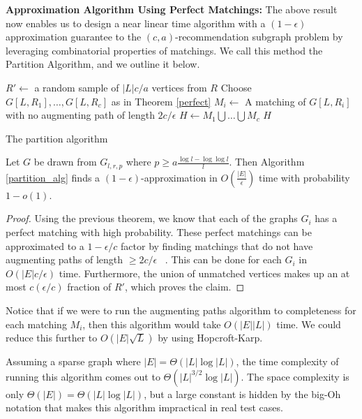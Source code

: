 \vs

{\bf Approximation Algorithm Using Perfect Matchings:}
The above result now enables us to design a near linear time
algorithm with a $(1-\epsilon)$ approximation guarantee
to the $(c,a)$-recommendation subgraph problem by leveraging
combinatorial properties of matchings. We call this method
the Partition Algorithm, and we outline it below.

\begin{algorithm}[h]\label{partition_alg}
  \SetAlgoLined
  $R' \leftarrow$ a random sample of $|L|c/a$ vertices from $R$\;
  Choose $G[L,R_1],\ldots,G[L,R_c]$ as in Theorem \ref{perfect}\;
   {
    $M_i \leftarrow$ A matching of $G[L,R_i]$ with no augmenting path of length $2c/\epsilon$\;
  }
  $H \leftarrow M_1\bigcup\ldots \bigcup M_c$\;
  \Return $H$\;
  \caption{The partition algorithm}
\end{algorithm}\vs

\begin{thm}
Let $G$ be drawn from $G_{l,r,p}$ where $p \geq a\frac{\log l - \log\log l}{l}$.
Then Algorithm \ref{partition_alg} finds a $(1-\epsilon)$-approximation
in $O(\frac{|E|}{\epsilon})$ time with probability $1-o(1)$.
\end{thm}
\begin{proof}
Using the previous theorem, we know that each of the graphs $G_i$ has a
perfect matching with high probability. These perfect matchings
can be approximated to a $1-\epsilon/c$ factor by finding matchings
that do not have augmenting paths of length $\geq 2c/\epsilon$
~\cite{LovaszPlummer1986}. This can be done for each $G_i$ in
$O(|E|c/\epsilon)$ time. Furthermore, the union of unmatched vertices
makes up an at most $c(\epsilon/c)$ fraction of $R'$, which proves the claim.
\end{proof}

Notice that if we were to run the augmenting paths algorithm to completeness
for each matching $M_i$, then this algorithm would take $O(|E||L|)$ time. We
could reduce this further to $O(|E|\sqrt{L})$ by using Hopcroft-Karp.
\cite{HopcroftKarp} \vs

Assuming
a sparse graph where $|E|=\Theta(|L|\log|L|)$, the time complexity of running
this algorithm comes out to $\Theta(|L|^{3/2}\log|L|)$.  The space complexity
is only $\Theta(|E|) = \Theta(|L|\log|L|)$, but a large constant is hidden by
the big-Oh notation that makes this algorithm impractical in real test cases. 